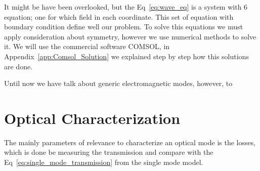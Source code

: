 It might be have been overlooked, but the Eq~\ref{eq:wave_eq} is a system with 6 equation; one for which field in each coordinate. This set of equation with boundary condition define well our problem. To solve this equations we must apply consideration about symmetry, however we use numerical methods to solve it. We will use the commercial software COMSOL\regmark, in Appendix~\ref{app:Comsol_Solution} we explained step by step how this solutions are done. 

Until now we have talk about generic electromagnetic modes, however, to 

%







\section{Optical Characterization}

The mainly parameters of relevance to characterize an optical mode is the losses, which is done be measuring the transmission and compare with the Eq~\ref{eq:single_mode_transmission} from the single mode model. 

